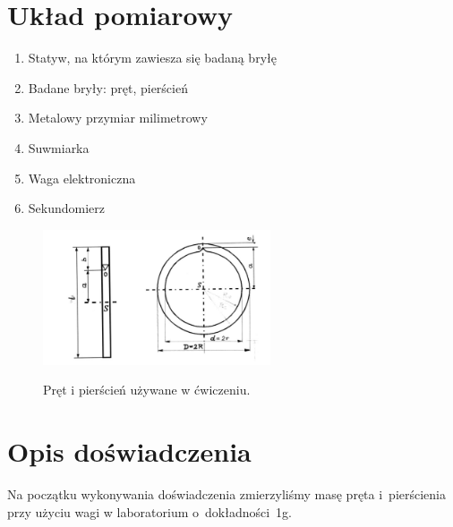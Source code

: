 \documentclass{fizraport}
\begin{document}
\maketitle
\vfill

\section{Układ pomiarowy}

\begin{enumerate}
    \item Statyw, na którym zawiesza się badaną bryłę
    \item Badane bryły: pręt, pierścień
    \item Metalowy przymiar milimetrowy
    \item Suwmiarka
    \item Waga elektroniczna
    \item Sekundomierz
\end{enumerate}

\begin{figure}[htbp]
 \centering
 \includegraphics[width=0.6\textwidth,keepaspectratio=true]{rysunek1.png}
 \label{fig:pret}
   \caption{Pręt i pierścień używane w ćwiczeniu.}
\end{figure}
\vfill


\pagebreak
\section{Opis doświadczenia} 
Na początku wykonywania doświadczenia zmierzyliśmy masę pręta i~pierścienia przy użyciu wagi w laboratorium o~dokładności~1g.
\end{document}
